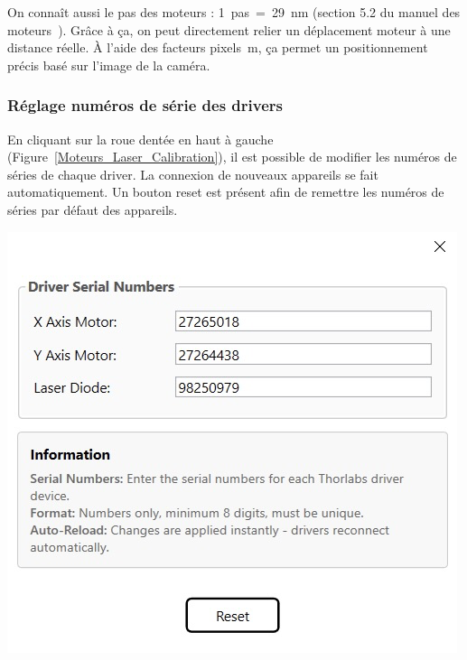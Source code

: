 On connaît aussi le pas des moteurs : 1~pas~=~29~nm (section 5.2 du manuel des moteurs~\cite{motorZ812B}). Grâce à ça, on peut directement relier un déplacement moteur à une distance réelle. À l'aide des facteurs pixels~\textmu m, ça permet un positionnement précis basé sur l'image de la caméra.

\subsubsection{Réglage numéros de série des drivers}

\begin{minipage}[c]{0.4\textwidth}
    En cliquant sur la roue dentée en haut à gauche (Figure~\ref{Moteurs_Laser_Calibration}), il est possible de modifier les numéros de séries de chaque driver. La connexion de nouveaux appareils se fait automatiquement. Un bouton reset est présent afin de remettre les numéros de séries par défaut des appareils.
\end{minipage}
\begin{minipage}[c]{0.58\textwidth}
    \begin{center}
        \includegraphics[width=\textwidth]{assets/figures/Application_ServoVision/Settings_Drivers.png}
    \end{center}
    \label{Settings_Drivers}
\end{minipage}

